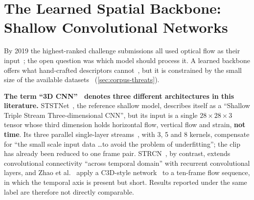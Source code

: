 \section{The Learned Spatial Backbone: Shallow Convolutional Networks}
\label{sec:cnn-review}

By 2019 the highest-ranked challenge submissions all used optical flow as their input~\cite{see2019}; the open question was which model should process it. A learned backbone offers what hand-crafted descriptors cannot~\cite{liong2019b}, but it is constrained by the small size of the available datasets~\cite{li2022survey} (\autoref{sec:corpus-threats}).

\textbf{The term ``3D CNN''~\cite{ji2013,tran2015} denotes three different architectures in this literature.} STSTNet~\cite{liong2019b}, the reference shallow model, describes itself as a ``Shallow Triple Stream Three-dimensional CNN'', but its input is a single $28 \times 28 \times 3$ tensor whose third dimension holds horizontal flow, vertical flow and strain, \textbf{not time}. Its three parallel single-layer streams~\cite{liong2019b}, with 3, 5 and 8 kernels, compensate for ``the small scale input data \ldots to avoid the problem of underfitting''; the clip has already been reduced to one frame pair. STRCN~\cite{xia2020a}, by contrast, extends convolutional connectivity ``across temporal domain'' with recurrent convolutional layers, and Zhao et al.~\cite{zhaoS2021} apply a C3D-style network~\cite{tran2015} to a ten-frame flow sequence, in which the temporal axis is present but short. Results reported under the same label are therefore not directly comparable.

